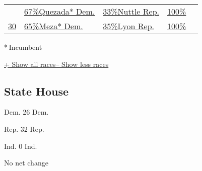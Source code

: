 \begin{longtable}[]{@{}lllll@{}}
&
\href{//www.nytimes3xbfgragh.onion/elections/2016/results/arizona-state-senate-district-29}{
67\%Quezada* Dem.} &
\href{//www.nytimes3xbfgragh.onion/elections/2016/results/arizona-state-senate-district-29}{
33\%Nuttle Rep.} &
\href{//www.nytimes3xbfgragh.onion/elections/2016/results/arizona-state-senate-district-29}{100\%}
&
\href{//www.nytimes3xbfgragh.onion/elections/2016/results/arizona-state-senate-district-29}{}\tabularnewline
\href{//www.nytimes3xbfgragh.onion/elections/2016/results/arizona-state-senate-district-30}{30}
&
\href{//www.nytimes3xbfgragh.onion/elections/2016/results/arizona-state-senate-district-30}{
65\%Meza* Dem.} &
\href{//www.nytimes3xbfgragh.onion/elections/2016/results/arizona-state-senate-district-30}{
35\%Lyon Rep.} &
\href{//www.nytimes3xbfgragh.onion/elections/2016/results/arizona-state-senate-district-30}{100\%}
&
\href{//www.nytimes3xbfgragh.onion/elections/2016/results/arizona-state-senate-district-30}{}\tabularnewline
\bottomrule
\end{longtable}

* Incumbent~

\protect\hyperlink{}{+ Show all races-- Show less races}

\hypertarget{state-house}{%
\subsection{State House}\label{state-house}}

Dem. 26 Dem.

Rep. 32 Rep.

Ind. 0 Ind.

No net change

